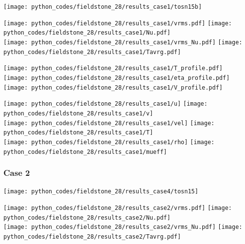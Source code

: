 \begin{center}
\texttt{[image: python\_codes/fieldstone\_28/results\_case1/tosn15b]}
\end{center}

\begin{center}
\texttt{[image: python\_codes/fieldstone\_28/results\_case1/vrms.pdf]}
\texttt{[image: python\_codes/fieldstone\_28/results\_case1/Nu.pdf]}\\
\texttt{[image: python\_codes/fieldstone\_28/results\_case1/vrms\_Nu.pdf]}
\texttt{[image: python\_codes/fieldstone\_28/results\_case1/Tavrg.pdf]}
\end{center}

\begin{center}
\texttt{[image: python\_codes/fieldstone\_28/results\_case1/T\_profile.pdf]}
\texttt{[image: python\_codes/fieldstone\_28/results\_case1/eta\_profile.pdf]}
\texttt{[image: python\_codes/fieldstone\_28/results\_case1/V\_profile.pdf]}
\end{center}
\newpage
\begin{center}
\texttt{[image: python\_codes/fieldstone\_28/results\_case1/u]}
\texttt{[image: python\_codes/fieldstone\_28/results\_case1/v]}\\
\texttt{[image: python\_codes/fieldstone\_28/results\_case1/vel]}
\texttt{[image: python\_codes/fieldstone\_28/results\_case1/T]}\\
\texttt{[image: python\_codes/fieldstone\_28/results\_case1/rho]}
\texttt{[image: python\_codes/fieldstone\_28/results\_case1/mueff]}
\end{center}









\newpage %
\subsubsection*{Case 2}

\texttt{[image: python\_codes/fieldstone\_28/results\_case4/tosn15]}

\begin{center}
\texttt{[image: python\_codes/fieldstone\_28/results\_case2/vrms.pdf]}
\texttt{[image: python\_codes/fieldstone\_28/results\_case2/Nu.pdf]}\\
\texttt{[image: python\_codes/fieldstone\_28/results\_case2/vrms\_Nu.pdf]}
\texttt{[image: python\_codes/fieldstone\_28/results\_case2/Tavrg.pdf]}
\end{center}

